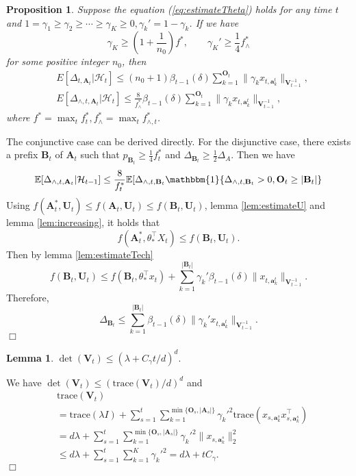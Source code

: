 \documentclass{article}
\newcommand{\EE}{\mathbb{E}}
\newcommand{\bOne}{\mathbbm{1}}
\newcommand{\bA}{\mathbf{A}}
\newcommand{\ba}{\mathbf{a}}
\newcommand{\bB}{\mathbf{B}}
\newcommand{\bO}{\mathbf{O}}
\newcommand{\bU}{\mathbf{U}}
\newcommand{\bV}{\mathbf{V}}
\newcommand{\cH}{\mathcal{H}}
\newcommand{\trace}{\mathrm{trace}}
\newcommand{\abs}[1]{\left| #1 \right|}
\newcommand{\norm}[1]{\| #1 \|}
\newtheorem{proposition}[theorem]{Proposition}%
\newtheorem{lemma}[theorem]{Lemma}%
\newenvironment{proof}{\noindent {\textbf{Proof. }}}{$\Box$ \medskip}
\begin{document}
\begin{proposition}
Suppose the equation (\ref{eq:estimateTheta}) holds for any time $t$ and $1 = \gamma_1 \geq \gamma_2 \geq \cdots \geq \gamma_K \geq 0, \gamma_k' = 1 - \gamma_k$. If we have
$$
\gamma_K \geq (1+\frac{1}{n_0})f^{\ast}, \qquad \gamma_K' \geq \frac{1}{4} f_{\wedge}^{\ast}
$$
for some positive integer $n_0$, then
\begin{align*}
&E[\Delta_{t, \bA_t}|\cH_t] \leq (n_0+1) \beta_{t-1}(\delta)\sum_{k=1}^{\bO_t}\norm{\gamma_k x_{t,\ba_k^t}}_{\bV_{t-1}^{-1}},\\
&E[\Delta_{\wedge, t, \bA_t}|\cH_t] \leq \frac{8}{f_{\wedge}^{\ast}} \beta_{t-1}(\delta)\sum_{k=1}^{\bO_t}\norm{\gamma_k x_{t,\ba_k^t}}_{\bV_{t-1}^{-1}},
\end{align*}
where $f^{\ast} = \max_{t} f_t^{\ast}, f_{\wedge}^{\ast} = \max_{t} f_{\wedge, t}^{\ast}$.
\end{proposition}
\begin{proof}
The conjunctive case can be derived directly. For the disjunctive case, there exists a prefix $\bB_t$ of $\bA_t$ such that $p_{\bB_t} \geq \frac{1}{4}f_t^*$ and $\Delta_{\bB_t} \geq \frac{1}{2}\Delta_A$. Then we have
$$
\EE[\Delta_{\wedge, t, \bA_t} | \cH_{t-1}] \leq \frac{8}{f_t^*} \EE[\Delta_{\wedge, t, \bB_t} \bOne\{\Delta_{\wedge, t, \bB_t} > 0, \bO_t \geq \abs{\bB_t}\}
$$
Using $f(\bA_t^*,\bU_t) \leq f(\bA_t,\bU_t) \leq f(\bB_t,\bU_t)$, lemma \ref{lem:estimateU} and lemma \ref{lem:increasing}, it holds that
$$
f(\bA_t^*, \theta_*^{\top}X_t) \leq f(\bB_t,\bU_t).
$$
Then by lemma \ref{lem:estimateTech}
$$
f(\bB_t,\bU_t) \leq f(\bB_t, \theta_*^{\top}x_t) + \sum_{k=1}^{\abs{\bB_t}}\gamma_k'\beta_{t-1}(\delta)\norm{x_{t,\ba_k^t}}_{\bV_{t-1}^{-1}}.
$$
Therefore,
$$
\Delta_{\bB_t} \leq \sum_{k=1}^{\abs{\bB_t}}\beta_{t-1}(\delta)\norm{\gamma_k' x_{t,\ba_k^t}}_{\bV_{t-1}^{-1}}.
$$
\end{proof}
	
\begin{lemma} %
$\det(\bV_t) \leq (\lambda + C_\gamma t/d)^d.$
\end{lemma}
\begin{proof}
We have $\det(\bV_t) \leq (\trace(\bV_t)/d)^d$ and
\begin{align*}
&\trace(\bV_t)\\
& = \trace(\lambda I) + \sum_{s=1}^t \sum_{k=1}^{\min\{\bO_s,\abs{\bA_s}\}} \gamma_k'^2 \trace(x_{s,\ba_k^s} x_{s,\ba_k^s}^{\top})\\	
& = d \lambda + \sum_{s=1}^t \sum_{k=1}^{\min\{\bO_s,\abs{\bA_s}\}} \gamma_k'^2 \norm{x_{s,\ba_k^s}}_2^2\\
& \leq d \lambda + \sum_{s=1}^t\sum_{k=1}^{K}\gamma_k'^2=d\lambda + tC_\gamma.
\end{align*}
\end{proof}
\end{document}
